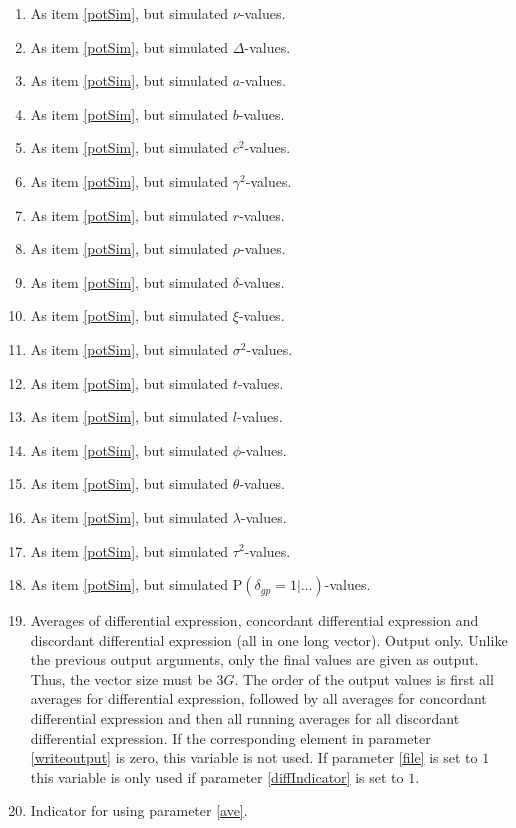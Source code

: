 \documentclass[11pt]{article}
\begin{document}
\begin{enumerate}
\item As item \ref{potSim}, but simulated $\nu$-values.

\item As item \ref{potSim}, but simulated $\Delta$-values.

\item As item \ref{potSim}, but simulated $a$-values.

\item As item \ref{potSim}, but simulated $b$-values.

\item As item \ref{potSim}, but simulated $c^2$-values.

\item As item \ref{potSim}, but simulated $\gamma^2$-values.

\item As item \ref{potSim}, but simulated $r$-values.

\item As item \ref{potSim}, but simulated $\rho$-values.

\item As item \ref{potSim}, but simulated $\delta$-values.

\item As item \ref{potSim}, but simulated $\xi$-values.

\item As item \ref{potSim}, but simulated $\sigma^2$-values.

\item As item \ref{potSim}, but simulated $t$-values.

\item As item \ref{potSim}, but simulated $l$-values.

\item As item \ref{potSim}, but simulated $\phi$-values.

\item As item \ref{potSim}, but simulated $\theta$-values.

\item As item \ref{potSim}, but simulated $\lambda$-values.

\item As item \ref{potSim}, but simulated $\tau^2$-values.

\item As item \ref{potSim}, but simulated 
$\mbox{P}(\delta_{gp}=1|\ldots )$-values.

\item \label{ave}Averages of differential expression, concordant differential expression
and discordant differential expression (all in one long vector). Output only. 
Unlike the previous output arguments, only the final values are given as output.
Thus, the vector size must be $3G$. The order of the output values is first all
averages for differential expression, followed by all averages for concordant
differential expression and then all running averages for all discordant differential 
expression. If the corresponding element in parameter \ref{writeoutput} is zero, 
this variable is not used. If parameter \ref{file} is set to $1$ this variable is 
only used if parameter \ref{diffIndicator} is set to $1$.

\item \label{diffIndicator}Indicator for using parameter \ref{ave}. 
\end{enumerate}
\end{document}
